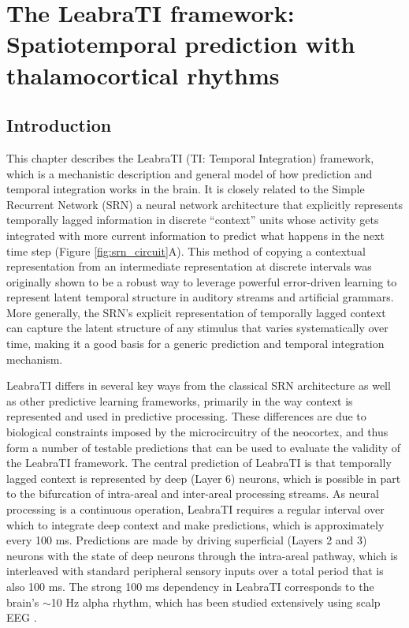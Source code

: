 \documentclass[dwyatte_dissertation.tex]{subfiles}
\begin{document}
\sloppy
{}

\chapter{The LeabraTI framework: Spatiotemporal prediction with thalamocortical rhythms}
\label{chap:leabrati}

\section{Introduction}
This chapter describes the LeabraTI (TI: Temporal Integration) framework, which is a mechanistic description and general model of how prediction and temporal integration works in the brain. It is closely related to the Simple Recurrent Network (SRN) \cite{Elman90,Servan-SchreiberCleeremansMcClelland91} a neural network architecture that explicitly represents temporally lagged information in discrete ``context'' units whose activity gets integrated with more current information to predict what happens in the next time step (Figure \ref{fig:srn_circuit}A). This method of copying a contextual representation from an intermediate representation at discrete intervals was originally shown to be a robust way to leverage powerful error-driven learning to represent latent temporal structure in auditory streams and artificial grammars. More generally, the SRN's explicit representation of temporally lagged context can capture the latent structure of any stimulus that varies systematically over time, making it a good basis for a generic prediction and temporal integration mechanism.

LeabraTI differs in several key ways from the classical SRN architecture as well as other predictive learning frameworks, primarily in the way context is represented and used in predictive processing. These differences are due to biological constraints imposed by the microcircuitry of the neocortex, and thus form a number of testable predictions that can be used to evaluate the validity of the LeabraTI framework. The central prediction of LeabraTI is that temporally lagged context is represented by deep (Layer 6) neurons, which is possible in part to the bifurcation of intra-areal and inter-areal processing streams. As neural processing is a continuous operation, LeabraTI requires a regular interval over which to integrate deep context and make predictions, which is approximately every 100 ms. Predictions are made by driving superficial (Layers 2 and 3) neurons with the state of deep neurons through the intra-areal pathway, which is interleaved with standard peripheral sensory inputs over a total period that is also 100 ms. The strong 100 ms dependency in LeabraTI corresponds to the brain's $\sim$10 Hz alpha rhythm, which has been studied extensively using scalp EEG \cite[see][for comprehensive reviews]{PalvaPalva07,HanslmayrGrossKlimeschEtAl11,VanRullenBuschDrewesEtAl11}.
\end{document}

